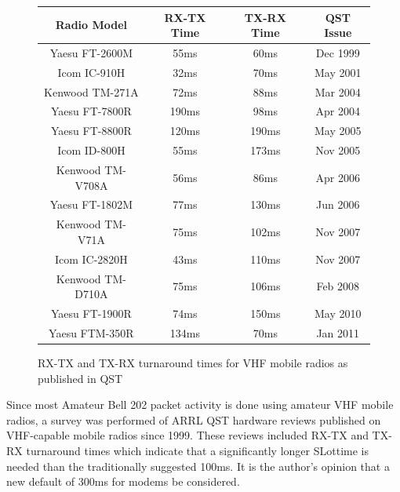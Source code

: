 \documentclass[12pt,letterpaper]{article}
\begin{document}
\begin{figure}[H]
	\begin{center}
	\begin{tabular}{ | c || c | c || c |}
		\hline
		Radio Model & RX-TX Time & TX-RX Time & QST Issue \\ \hline
		Yaesu FT-2600M & 55ms & 60ms & Dec 1999 \\ \hline
		Icom IC-910H & 32ms & 70ms & May 2001 \\ \hline
		Kenwood TM-271A & 72ms & 88ms & Mar 2004 \\ \hline
		Yaesu FT-7800R & 190ms & 98ms & Apr 2004 \\ \hline
		Yaesu FT-8800R & 120ms & 190ms & May 2005 \\ \hline
		Icom ID-800H & 55ms & 173ms & Nov 2005 \\ \hline
		Kenwood TM-V708A & 56ms & 86ms & Apr 2006 \\ \hline
		Yaesu FT-1802M & 77ms & 130ms & Jun 2006 \\ \hline
		Kenwood TM-V71A & 75ms & 102ms & Nov 2007 \\ \hline
		Icom IC-2820H & 43ms & 110ms & Nov 2007 \\ \hline
		Kenwood TM-D710A & 75ms & 106ms & Feb 2008 \\ \hline
		Yaesu FT-1900R & 74ms & 150ms & May 2010 \\ \hline
		Yaesu FTM-350R & 134ms & 70ms & Jan 2011 \\ \hline

	\end{tabular}
	\caption{RX-TX and TX-RX turnaround times for VHF mobile radios as published in QST}
	\end{center}
	\label{fig:TXRXtime}
\end{figure}

Since most Amateur Bell 202 packet activity is done using amateur VHF mobile radios,
a survey was performed of ARRL QST hardware reviews published on VHF-capable
mobile radios since 1999.
These reviews included RX-TX and TX-RX turnaround times
which indicate that a significantly longer SLottime is needed than the 
traditionally suggested 100ms.
It is the author's opinion that a new default of 300ms for modems be considered.
\end{document}
